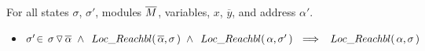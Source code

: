  
\begin{lemma}%
\label{lemma:push:N}
For all states $\sigma$, $\sigma'$, modules $\overline{M}$, variables, $x$, $\overline {y}$, and address $\alpha'$.  

\begin{itemize} %
\item
\label{oneLR}
{$ \sigma'\!\in\! \PushS {\alpha} {\sigma}   \ \wedge  \  \LRelevant {\overline \alpha} {\sigma}  \ \wedge\    \LRelevant \alpha {\sigma'} \ \  \Longrightarrow\ \ 
 \LRelevant \alpha {\sigma}$
}

\end{itemize}  %

\end{lemma}
  
